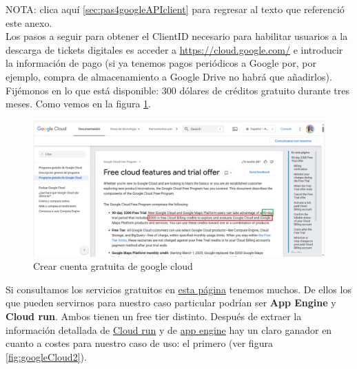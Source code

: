 \documentclass[a4paper,12pt]{report}
\begin{document}
		NOTA: clica aquí \ref{sec:pas4googleAPIclient} para regresar al texto que referenció este anexo.\\
		
	
		Los pasos a seguir para obtener el ClientID necesario para habilitar usuarios a la descarga de tickets digitales es acceder a \href{https://cloud.google.com}{https://cloud.google.com/} e introducir la información de pago (si ya tenemos pagos periódicos a Google por, por ejemplo, compra de almacenamiento a Google Drive no habrá que añadirlos). Fijémonos en lo que está disponible: 300 dólares de créditos gratuito durante tres meses. Como vemos en la figura \ref{fig:googlecloud1}.
		
		\FloatBarrier
		\begin{figure}[H]
			\centering
			\caption{Crear cuenta gratuita de google cloud}
			\label{fig:googlecloud1}
			\includegraphics[width=1\linewidth]{img/googleCloud1.png}
		\end{figure}
		\FloatBarrier
		
		
		Si consultamos los servicios gratuitos en \href{https://cloud.google.com/free/docs/free-cloud-features?authuser=2#free-tier-usage-limits}{esta página} tenemos muchos. De ellos los que pueden servirnos para nuestro caso particular podrían ser \textbf{App Engine} y \textbf{Cloud run}. Ambos tienen un free tier distinto. Después de extraer la información detallada de \href{https://cloud.google.com/run/docs/overview/what-is-cloud-run?authuser=2&hl=es-419}{Cloud run} y de \href{https://cloud.google.com/appengine/docs/an-overview-of-app-engine?authuser=2&hl=es-419}{app engine} hay un claro ganador en cuanto a costes para nuestro caso de uso: el primero (ver figura \ref{fig:googleCloud2}).
		
\end{document}
